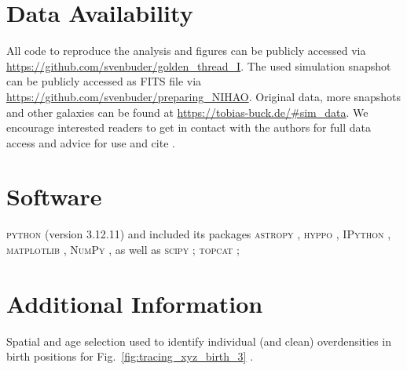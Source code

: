 \documentclass[fleqn,usenatbib]{mnras}
\begin{document}
\section*{Data Availability}

All code to reproduce the analysis and figures can be publicly accessed via \url{https://github.com/svenbuder/golden_thread_I}.
The used simulation snapshot can be publicly accessed as FITS file via \url{https://github.com/svenbuder/preparing_NIHAO}. Original data, more snapshots and other galaxies can be found at \url{https://tobias-buck.de/#sim_data}. We encourage interested readers to get in contact with the authors for full data access and advice for use and cite \citet{Buck2020b, Buck2021}.

\section*{Software}

\textsc{python} (version 3.12.11) and included its packages
\textsc{astropy} \citep[v. 7.1.0;][]{Robitaille2013,PriceWhelan2018},
\textsc{hyppo} \citep[v. 0.5.2;][]{hyppo},
\textsc{IPython} \citep[v. 9.1.0;][]{ipython},
\textsc{matplotlib} \citep[v. 3.10.3;][]{matplotlib},
\textsc{NumPy} \citep[v. 2.2.6;][]{numpy}, as well as
\textsc{scipy} \citep[v. 1.16.0;][]{Scipy}; \textsc{topcat} \citep[version 4.7;][]{Taylor2005};
 



\appendix

\section{Additional Information}

\begin{table}
    \centering
    \caption{Spatial and age selection used to identify individual (and clean) overdensities in birth positions for Fig.~\ref{fig:tracing_xyz_birth_3} \href{https://github.com/svenbuder/golden_thread_I/tree/main/figures}{\faGithub}.}
    \renewcommand{\arraystretch}{0.9}
    
    \label{tab:birth_position_tabular}
\end{table}
\end{document}
